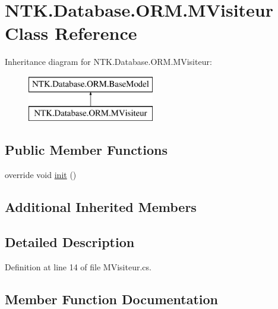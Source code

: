 \hypertarget{class_n_t_k_1_1_database_1_1_o_r_m_1_1_m_visiteur}{}\section{N\+T\+K.\+Database.\+O\+R\+M.\+M\+Visiteur Class Reference}
\label{class_n_t_k_1_1_database_1_1_o_r_m_1_1_m_visiteur}
Inheritance diagram for N\+T\+K.\+Database.\+O\+R\+M.\+M\+Visiteur\+:\begin{figure}[H]
\begin{center}
\leavevmode
\includegraphics[height=2.000000cm]{d9/d08/class_n_t_k_1_1_database_1_1_o_r_m_1_1_m_visiteur}
\end{center}
\end{figure}
\subsection*{Public Member Functions}
\begin{DoxyCompactItemize}
\item 
override void \mbox{\hyperlink{class_n_t_k_1_1_database_1_1_o_r_m_1_1_m_visiteur_a6dd427b0024d9765aa329b010d0b7ecd}{init}} ()
\end{DoxyCompactItemize}
\subsection*{Additional Inherited Members}


\subsection{Detailed Description}


Definition at line 14 of file M\+Visiteur.\+cs.



\subsection{Member Function Documentation}
\mbox{\label{class_n_t_k_1_1_database_1_1_o_r_m_1_1_m_visiteur_a6dd427b0024d9765aa329b010d0b7ecd}} 
